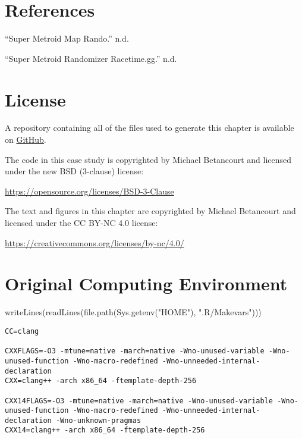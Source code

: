 \documentclass[
  letterpaper,
  DIV=11,
  numbers=noendperiod]{scrartcl}
\newenvironment{Shaded}{\begin{snugshade}}{\end{snugshade}}
\newcommand{\FunctionTok}[1]{\textcolor[rgb]{0.28,0.35,0.67}{#1}}
\newcommand{\NormalTok}[1]{\textcolor[rgb]{0.00,0.23,0.31}{#1}}
\newcommand{\StringTok}[1]{\textcolor[rgb]{0.13,0.47,0.30}{#1}}
\newlength{\cslhangindent}
\newenvironment{CSLReferences}[2] %
 {\begin{list}{}{%
  \setlength{\itemindent}{0pt}
  \setlength{\leftmargin}{0pt}
  \setlength{\parsep}{0pt}
  \ifodd #1
   \setlength{\leftmargin}{\cslhangindent}
   \setlength{\itemindent}{-1\cslhangindent}
  \fi
  \setlength{\itemsep}{#2\baselineskip}}}
 {\end{list}}
\begin{document}
\section*{References}\label{references}

\label{refs}
\begin{CSLReferences}{1}{0}
{``Super Metroid Map Rando.''} n.d.

{``Super Metroid Randomizer \textbar{} Racetime.gg.''} n.d.

\end{CSLReferences}

\section*{License}\label{license}

A repository containing all of the files used to generate this chapter
is available on
\href{https://github.com/betanalpha/quarto_case_studies/tree/main/case_studies/racing}{GitHub}.

The code in this case study is copyrighted by Michael Betancourt and
licensed under the new BSD (3-clause) license:

\url{https://opensource.org/licenses/BSD-3-Clause}

The text and figures in this chapter are copyrighted by Michael
Betancourt and licensed under the CC BY-NC 4.0 license:

\url{https://creativecommons.org/licenses/by-nc/4.0/}

\section*{Original Computing
Environment}\label{original-computing-environment}

\begin{Shaded}
\begin{Highlighting}[]
\FunctionTok{writeLines}\NormalTok{(}\FunctionTok{readLines}\NormalTok{(}\FunctionTok{file.path}\NormalTok{(}\FunctionTok{Sys.getenv}\NormalTok{(}\StringTok{"HOME"}\NormalTok{), }\StringTok{".R/Makevars"}\NormalTok{)))}
\end{Highlighting}
\end{Shaded}

\begin{verbatim}
CC=clang

CXXFLAGS=-O3 -mtune=native -march=native -Wno-unused-variable -Wno-unused-function -Wno-macro-redefined -Wno-unneeded-internal-declaration
CXX=clang++ -arch x86_64 -ftemplate-depth-256

CXX14FLAGS=-O3 -mtune=native -march=native -Wno-unused-variable -Wno-unused-function -Wno-macro-redefined -Wno-unneeded-internal-declaration -Wno-unknown-pragmas
CXX14=clang++ -arch x86_64 -ftemplate-depth-256
\end{verbatim}
\end{document}
